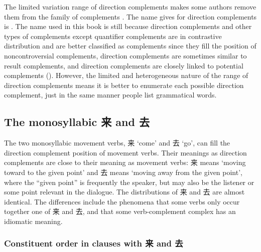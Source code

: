 \documentclass[../main.tex]{subfiles}
\begin{document}
The limited variation range of direction complements makes 
some authors remove them from the family of complements \citep[]{po2015chinese}.
The name \citet{po2015chinese} gives for direction complements is .
The name used in this book is still  because 
direction complements and other types of complements except quantifier complements 
are in contrastive distribution and are better classified as complements 
since they fill the position of noncontroversial complements, 
direction complements are sometimes similar to result complements, %
and direction complements are closely linked to potential complements 
().
However, the limited and heterogeneous nature of the range of direction complements 
means it is better to enumerate each possible direction complement, 
just in the same manner people list grammatical words.

\subsection{The monosyllabic 来 and 去}

The two monosyllabic movement verbs, 来 `come' and 去 `go', 
can fill the direction complement position of movement verbs. %
Their meanings as direction complements are close to their meaning as movement verbs:
来 means `moving toward to the given point' and 去 means `moving away from the given point',
where the ``given point'' is frequently the speaker, 
but may also be the listener or some point relevant in the dialogue.
The distributions of 来 and 去 are almost identical. 
The differences include the phenomena that some verbs only occur together one of 来 and 去,
and that some verb-complement complex has an idiomatic meaning.

\subsubsection{Constituent order in clauses with 来 and 去}
\end{document}
